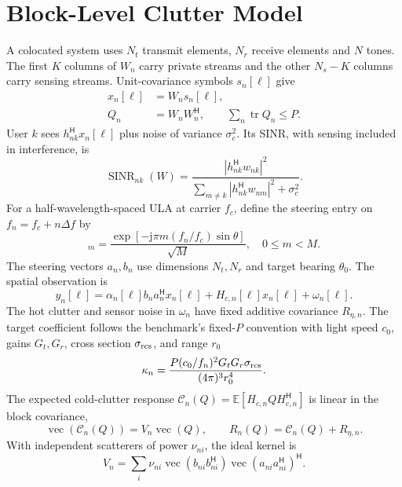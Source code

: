 \documentclass[journal]{IEEEtran}
\DeclareMathOperator{\tr}{tr}
\DeclareMathOperator{\vecop}{vec}
\DeclareMathOperator{\SINR}{SINR}
\newcommand{\HH}{^{\mathsf H}}
\newcommand{\E}{\mathbb E}
\begin{document}
\section{Block-Level Clutter Model}
A colocated system uses \(N_t\) transmit elements, \(N_r\) receive elements and \(N\) tones. The first \(K\) columns of \(W_n\) carry private streams and the other \(N_s-K\) columns carry sensing streams. Unit-covariance symbols \(s_n[\ell]\) give
\begin{align}
 x_n[\ell]&=W_n s_n[\ell],\\
 Q_n&=W_nW_n\HH,\qquad \sum_n\tr Q_n\le P .
 \label{eq:power}
\end{align}
User \(k\) sees \(h_{nk}\HH x_n[\ell]\) plus noise of variance \(\sigma_c^2\). Its SINR, with sensing included in interference, is
\begin{equation}
 \SINR_{nk}(W)=
 \frac{|h_{nk}\HH w_{nk}|^2}
 {\sum_{m\ne k}|h_{nk}\HH w_{nm}|^2+\sigma_c^2}.
 \label{eq:sinr}
\end{equation}
For a half-wavelength-spaced ULA at carrier \(f_c\), define the steering entry on \(f_n=f_c+n\Delta f\) by
\begin{equation}
 [a_M(\theta,n)]_m=\frac{\exp[-\mathrm{j}\pi m(f_n/f_c)\sin\theta]}{\sqrt M},
 \quad 0\le m<M .
\end{equation}
The steering vectors \(a_n,b_n\) use dimensions \(N_t,N_r\) and target bearing \(\theta_0\). The spatial observation is
\begin{equation}
 y_n[\ell]=\alpha_n[\ell] b_na_n\HH x_n[\ell]
             +H_{c,n}[\ell]x_n[\ell]+\omega_n[\ell].
\end{equation}
The hot clutter and sensor noise in \(\omega_n\) have fixed additive covariance \(R_{\eta,n}\). The target coefficient follows the benchmark's fixed-\(P\) convention with light speed \(c_0\), gains \(G_t,G_r\), cross section \(\sigma_{\rm rcs}\), and range \(r_0\)~\cite{liu2026clutter}
\begin{equation}
 \kappa_n=\frac{P(c_0/f_n)^2G_tG_r\sigma_{\rm rcs}}{(4\pi)^3r_0^4}.
 \label{eq:target}
\end{equation}
The expected cold-clutter response \(\mathcal C_n(Q)=\E[H_{c,n}QH_{c,n}\HH]\) is linear in the block covariance,
\begin{equation}
 \vecop(\mathcal C_n(Q))=V_n\vecop(Q),\qquad
 R_n(Q)=\mathcal C_n(Q)+R_{\eta,n}.
 \label{eq:linear}
\end{equation}
With independent scatterers of power \(\nu_{ni}\), the ideal kernel is
\begin{equation}
 V_n=\sum_i \nu_{ni}\vecop(b_{ni}b_{ni}\HH)
                         \vecop(a_{ni}a_{ni}\HH)\HH .
 \label{eq:ideal}
\end{equation}
\end{document}
